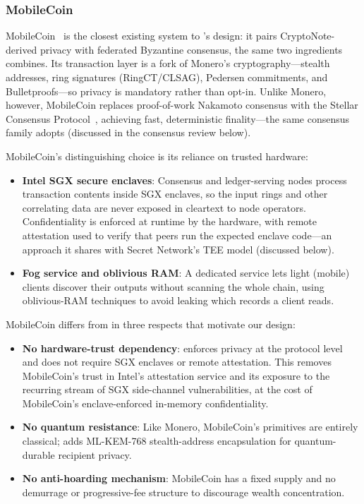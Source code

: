 \subsubsection{MobileCoin}

MobileCoin~\cite{mobilecoin} is the closest existing system to \Botho's
design: it pairs CryptoNote-derived privacy with federated Byzantine
consensus, the same two ingredients \Botho combines. Its transaction layer
is a fork of Monero's cryptography---stealth addresses, ring signatures
(RingCT/CLSAG), Pedersen commitments, and Bulletproofs---so privacy is
mandatory rather than opt-in. Unlike Monero, however, MobileCoin replaces
proof-of-work Nakamoto consensus with the Stellar Consensus
Protocol~\cite{scp}, achieving fast, deterministic finality---the same
consensus family \Botho adopts (discussed in the consensus review below).

MobileCoin's distinguishing choice is its reliance on trusted hardware:
\begin{itemize}
  \item \textbf{Intel SGX secure enclaves}: Consensus and ledger-serving
    nodes process transaction contents inside SGX enclaves, so the input
    rings and other correlating data are never exposed in cleartext to node
    operators. Confidentiality is enforced at runtime by the hardware, with
    remote attestation used to verify that peers run the expected enclave
    code---an approach it shares with Secret Network's TEE model (discussed
    below).
  \item \textbf{Fog service and oblivious RAM}: A dedicated service lets
    light (mobile) clients discover their outputs without scanning the whole
    chain, using oblivious-RAM techniques to avoid leaking which records a
    client reads.
\end{itemize}

MobileCoin differs from \Botho in three respects that motivate our design:
\begin{itemize}
  \item \textbf{No hardware-trust dependency}: \Botho enforces privacy at the
    protocol level and does not require SGX enclaves or remote attestation.
    This removes MobileCoin's trust in Intel's attestation service and its
    exposure to the recurring stream of SGX side-channel vulnerabilities, at
    the cost of MobileCoin's enclave-enforced in-memory confidentiality.
  \item \textbf{No quantum resistance}: Like Monero, MobileCoin's primitives
    are entirely classical; \Botho adds ML-KEM-768 stealth-address
    encapsulation for quantum-durable recipient privacy.
  \item \textbf{No anti-hoarding mechanism}: MobileCoin has a fixed supply and
    no demurrage or progressive-fee structure to discourage wealth
    concentration.
\end{itemize}

